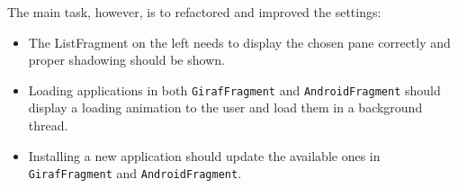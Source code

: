 The main task, however, is to refactored and improved the settings:

\begin{itemize}
\item The ListFragment on the left needs to display the chosen pane correctly and proper shadowing should be shown.
\item Loading applications in both \lstinline!GirafFragment! and \lstinline!AndroidFragment! should display a loading animation to the user and load them in a background thread.
\item Installing a new application should update the available ones in \lstinline!GirafFragment! and \lstinline!AndroidFragment!.
\end{itemize}